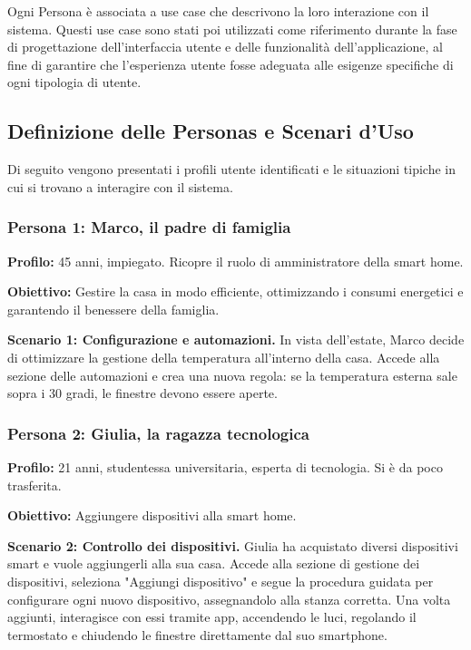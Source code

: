 \documentclass[a4paper,12pt]{article}
\begin{document}
Ogni Persona è associata a use case che descrivono la loro interazione con il sistema. Questi use case sono stati poi utilizzati come riferimento durante la fase di progettazione dell'interfaccia utente e delle funzionalità dell'applicazione, al fine di garantire che l'esperienza utente fosse adeguata alle esigenze specifiche di ogni tipologia di utente.

\subsection{Definizione delle Personas e Scenari d'Uso}
Di seguito vengono presentati i profili utente identificati e le situazioni tipiche in cui si trovano a interagire con il sistema.

\subsubsection{Persona 1: Marco, il padre di famiglia}

\textbf{Profilo:} 45 anni, impiegato. Ricopre il ruolo di amministratore della smart home.

\noindent\textbf{Obiettivo:} Gestire la casa in modo efficiente, ottimizzando i consumi energetici e garantendo il benessere della famiglia.

\noindent\textbf{Scenario 1: Configurazione e automazioni.} In vista dell'estate, Marco decide di ottimizzare la gestione della temperatura all'interno della casa. Accede alla sezione delle automazioni e crea una nuova regola: se la temperatura esterna sale sopra i 30 gradi, le finestre devono essere aperte. 

\subsubsection{Persona 2: Giulia, la ragazza tecnologica}

\textbf{Profilo:} 21 anni, studentessa universitaria, esperta di tecnologia. Si è da poco trasferita.

\noindent\textbf{Obiettivo:} Aggiungere dispositivi alla smart home.

\noindent\textbf{Scenario 2: Controllo dei dispositivi.} Giulia ha acquistato diversi dispositivi smart e vuole aggiungerli alla sua casa. Accede alla sezione di gestione dei dispositivi, seleziona "Aggiungi dispositivo" e segue la procedura guidata per configurare ogni nuovo dispositivo, assegnandolo alla stanza corretta. Una volta aggiunti, interagisce con essi tramite app, accendendo le luci, regolando il termostato e chiudendo le finestre direttamente dal suo smartphone.
\end{document}
